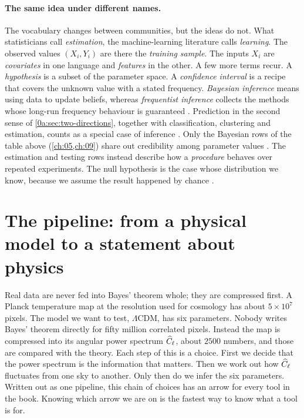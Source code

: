 \paragraph{The same idea under different names.}
The vocabulary changes between communities, but the ideas do not. What
statisticians call \emph{estimation}, the machine-learning literature calls
\emph{learning}. The observed values $(X_i,Y_i)$ are there the \emph{training
sample}. The inputs $X_i$ are \emph{covariates} in one language and
\emph{features} in the other. A few more terms recur. A \emph{hypothesis} is a
subset of the parameter space. A \emph{confidence interval} is a recipe that
covers the unknown value with a stated frequency. \emph{Bayesian inference}
means using data to update beliefs, whereas \emph{frequentist inference}
collects the methods whose long-run frequency behaviour is guaranteed
. Prediction in the second sense of
\cref{0a:sec:two-directions}, together with classification, clustering and
estimation, counts as a special case of inference . Only the
Bayesian rows of the table above (\cref{ch:05,ch:09}) share out credibility
among parameter values . The estimation and testing
rows instead describe how a \emph{procedure} behaves over repeated
experiments. The null hypothesis is the case whose distribution we know,
because we assume the result happened by chance .

\section{The pipeline: from a physical model to a statement about physics}\label{0a:sec:pipeline}

Real data are never fed into Bayes' theorem whole; they are compressed first.
A Planck temperature map at the resolution used for cosmology has about
$5\times10^{7}$ pixels. The model we want to test, $\Lambda$CDM, has six
parameters. Nobody writes Bayes' theorem directly for fifty million correlated
pixels. Instead the map is compressed into its angular power spectrum $\widehat{C}_\ell$,
about $2500$ numbers, and those are compared with the theory. Each step of
this is a choice. First we decide that the power spectrum is the information
that matters. Then we work out how $\widehat{C}_\ell$ fluctuates from one sky to another.
Only then do we infer the six parameters. Written out as one pipeline, this
chain of choices has an arrow for every tool in the book. Knowing which arrow
we are on is the fastest way to know what a tool is for.

